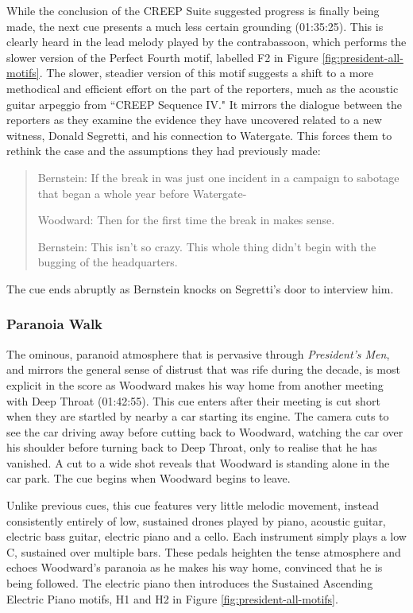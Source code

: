 While the conclusion of the CREEP Suite suggested progress is finally being made, the next cue presents a much less certain grounding (01:35:25).
This is clearly heard in the lead melody played by the contrabassoon, which performs the slower version of the Perfect Fourth motif, labelled F2 in Figure \ref{fig:president-all-motifs}.
The slower, steadier version of this motif suggests a shift to a more methodical and efficient effort on the part of the reporters, much as the acoustic guitar arpeggio from ``CREEP Sequence IV."
It mirrors the dialogue between the reporters as they examine the evidence they have uncovered related to a new witness, Donald Segretti, and his connection to Watergate.
This forces them to rethink the case and the assumptions they had previously made:
\begin{quote}
Bernstein: If the break in was just one incident in a campaign to sabotage that began a whole year before Watergate-

Woodward: Then for the first time the break in makes sense.

Bernstein: This isn’t so crazy. This whole thing didn’t begin with the bugging of the headquarters.

\end{quote}
The cue ends abruptly as Bernstein knocks on Segretti’s door to interview him.


\subsubsection{Paranoia Walk}

The ominous, paranoid atmosphere that is pervasive through \textit{President’s Men}, and mirrors the general sense of distrust that was rife during the decade, is most explicit in the score as Woodward makes his way home from another meeting with Deep Throat (01:42:55).
This cue enters after their meeting is cut short when they are startled by nearby a car starting its engine.
The camera cuts to see the car driving away before cutting back to Woodward, watching the car over his shoulder before turning back to Deep Throat, only to realise that he has vanished.
A cut to a wide shot reveals that Woodward is standing alone in the car park.
The cue begins when Woodward begins to leave.

Unlike previous cues, this cue features very little melodic movement, instead consistently entirely of low, sustained drones played by piano, acoustic guitar, electric bass guitar, electric piano and a cello.
Each instrument simply plays a low C, sustained over multiple bars.
These pedals heighten the tense atmosphere and echoes Woodward's paranoia as he makes his way home, convinced that he is being followed.
The electric piano then introduces the Sustained Ascending Electric Piano motifs, H1 and H2 in Figure \ref{fig:president-all-motifs}.


